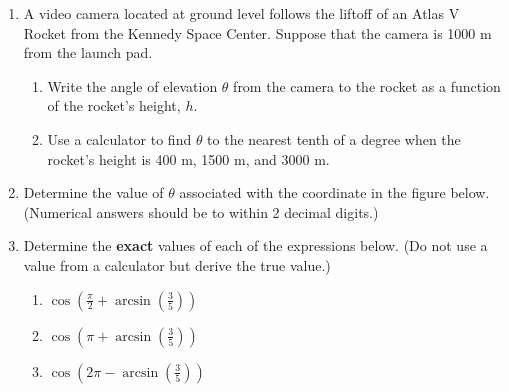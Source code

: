 \begin{enumerate}
\item A video camera located at ground level follows the liftoff of an Atlas V Rocket from the Kennedy Space Center.  Suppose that the camera is 1000 m from the launch pad.
\begin{enumerate}
\item Write the angle of elevation $\theta$ from the camera to the rocket as a function of the rocket's height, $h$.
\vfill
\item Use a calculator to find $\theta$ to the nearest tenth of a degree when the rocket's height is 400 m, 1500 m, and 3000 m.
\vfill
\end{enumerate}

\newpage
\item Determine the value of $\theta$ associated with the coordinate
      in the figure below. (Numerical answers should be to within 2
      decimal digits.)


\item Determine the \textbf{exact} values of each of the
  expressions below. (Do not use a value from a calculator but derive the true value.)
  \begin{enumerate}


  \item
    ${\displaystyle \cos\left(\frac{\pi}{2} + \arcsin\left(\frac{3}{5}\right) \right) }$ 
    \vfill
    
   \item
    ${\displaystyle \cos\left(\pi + \arcsin\left(\frac{3}{5}\right) \right) }$ 
    \vfill
    
      \item
    ${\displaystyle \cos\left(2\pi - \arcsin\left(\frac{3}{5}\right) \right) }$ 
    \vfill   
    


  \end{enumerate}

\end{enumerate}

